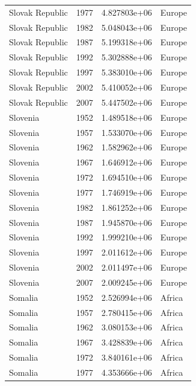 \documentclass[
  letterpaper,
  DIV=11,
  numbers=noendperiod]{scrreprt}
\begin{document}
\begin{tcolorbox}
\begin{tabular}{lrrl}
Slovak Republic          &  1977 &  4.827803e+06 &    Europe \\
Slovak Republic          &  1982 &  5.048043e+06 &    Europe \\
Slovak Republic          &  1987 &  5.199318e+06 &    Europe \\
Slovak Republic          &  1992 &  5.302888e+06 &    Europe \\
Slovak Republic          &  1997 &  5.383010e+06 &    Europe \\
Slovak Republic          &  2002 &  5.410052e+06 &    Europe \\
Slovak Republic          &  2007 &  5.447502e+06 &    Europe \\
Slovenia                 &  1952 &  1.489518e+06 &    Europe \\
Slovenia                 &  1957 &  1.533070e+06 &    Europe \\
Slovenia                 &  1962 &  1.582962e+06 &    Europe \\
Slovenia                 &  1967 &  1.646912e+06 &    Europe \\
Slovenia                 &  1972 &  1.694510e+06 &    Europe \\
Slovenia                 &  1977 &  1.746919e+06 &    Europe \\
Slovenia                 &  1982 &  1.861252e+06 &    Europe \\
Slovenia                 &  1987 &  1.945870e+06 &    Europe \\
Slovenia                 &  1992 &  1.999210e+06 &    Europe \\
Slovenia                 &  1997 &  2.011612e+06 &    Europe \\
Slovenia                 &  2002 &  2.011497e+06 &    Europe \\
Slovenia                 &  2007 &  2.009245e+06 &    Europe \\
Somalia                  &  1952 &  2.526994e+06 &    Africa \\
Somalia                  &  1957 &  2.780415e+06 &    Africa \\
Somalia                  &  1962 &  3.080153e+06 &    Africa \\
Somalia                  &  1967 &  3.428839e+06 &    Africa \\
Somalia                  &  1972 &  3.840161e+06 &    Africa \\
Somalia                  &  1977 &  4.353666e+06 &    Africa \\

\end{tabular}
\end{tcolorbox}
\end{document}

